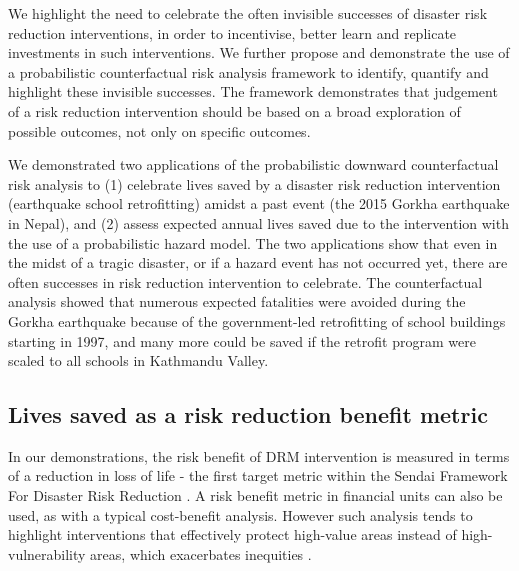\documentclass[utf8]{frontiersSCNS} %
\begin{document}
We highlight the need to celebrate the often invisible successes of disaster risk reduction interventions, in order to incentivise, better learn and replicate investments in such interventions. We further propose and demonstrate the use of a probabilistic counterfactual risk analysis framework to identify, quantify and highlight these invisible successes. The framework demonstrates that judgement of a risk reduction intervention should be based on a broad exploration of possible outcomes, not only on specific outcomes.

We demonstrated two applications of the probabilistic downward counterfactual risk analysis to (1) celebrate lives saved by a disaster risk reduction intervention (earthquake school retrofitting) amidst a past event (the 2015 Gorkha earthquake in Nepal), and (2) assess expected annual lives saved due to the intervention with the use of a probabilistic hazard model. The two applications show that even in the midst of a tragic disaster, or if a hazard event has not occurred yet, there are often successes in risk reduction intervention to celebrate. The counterfactual analysis showed that numerous expected fatalities were avoided during the Gorkha earthquake because of the government-led retrofitting of school buildings starting in 1997, and many more could be saved if the retrofit program were scaled to all schools in Kathmandu Valley. 

\vspace{0.5cm} %

\subsection{Lives saved as a risk reduction benefit metric}

In our demonstrations, the risk benefit of DRM intervention is measured in terms of a reduction in loss of life - the first target metric within the Sendai Framework For Disaster Risk Reduction \citep{united2015sendai}. A risk benefit metric in financial units can also be used, as with a typical cost-benefit analysis. However such analysis tends to highlight interventions that effectively protect high-value areas instead of high-vulnerability areas, which exacerbates inequities \citep{markhvida_quantification_2020, lallemant2020informatics}. 
\end{document}
